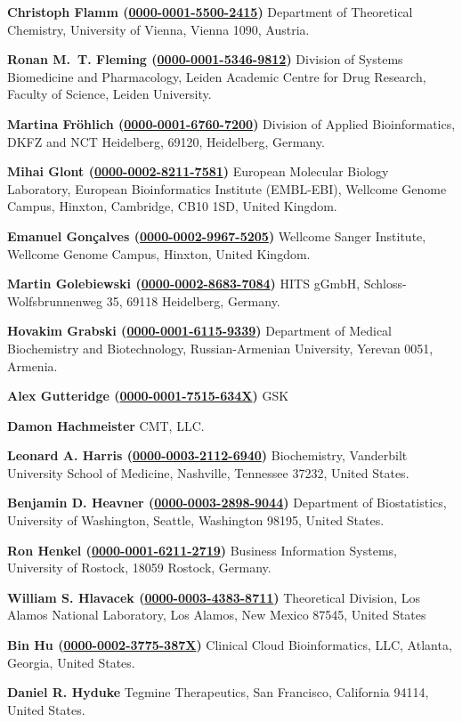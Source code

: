 \documentclass{sbml-paper}
\newcommand{\orcid}[1]{\href{https://orcid.org/#1}{#1}}
\begin{document}
\textbf{Christoph Flamm (\orcid{0000-0001-5500-2415})} Department of Theoretical Chemistry, University of Vienna, Vienna 1090, Austria.

\textbf{Ronan M.~T. Fleming (\orcid{0000-0001-5346-9812})} Division of Systems Biomedicine and Pharmacology, Leiden Academic Centre for Drug Research, Faculty of Science, Leiden University.

\textbf{Martina Fröhlich (\orcid{0000-0001-6760-7200})} Division of Applied Bioinformatics, DKFZ and NCT Heidelberg, 69120, Heidelberg, Germany.

\textbf{Mihai Glont (\orcid{0000-0002-8211-7581})} European Molecular Biology Laboratory, European Bioinformatics Institute (EMBL-EBI), Wellcome Genome Campus, Hinxton, Cambridge, CB10 1SD, United Kingdom.

\textbf{Emanuel Gonçalves (\orcid{0000-0002-9967-5205})} Wellcome Sanger Institute, Wellcome Genome Campus, Hinxton, United Kingdom.

\textbf{Martin Golebiewski (\orcid{0000-0002-8683-7084})} HITS gGmbH, Schloss-Wolfsbrunnenweg 35, 69118 Heidelberg, Germany.

\textbf{Hovakim Grabski (\orcid{0000-0001-6115-9339})} Department of Medical Biochemistry and Biotechnology, Russian-Armenian University, Yerevan 0051, Armenia.

\textbf{Alex Gutteridge (\orcid{0000-0001-7515-634X})} GSK

\textbf{Damon Hachmeister} CMT, LLC.

\textbf{Leonard A. Harris (\orcid{0000-0003-2112-6940})} Biochemistry, Vanderbilt University School of Medicine, Nashville, Tennessee 37232, United States.

\textbf{Benjamin D. Heavner (\orcid{0000-0003-2898-9044})} Department of Biostatistics, University of Washington, Seattle, Washington 98195, United States.

\textbf{Ron Henkel (\orcid{0000-0001-6211-2719})} Business Information Systems, University of Rostock, 18059 Rostock, Germany.

\textbf{William S. Hlavacek (\orcid{0000-0003-4383-8711})} Theoretical Division, Los Alamos National Laboratory, Los Alamos, New Mexico 87545, United States

\textbf{Bin Hu (\orcid{0000-0002-3775-387X})} Clinical Cloud Bioinformatics, LLC, Atlanta, Georgia, United States.

\textbf{Daniel R. Hyduke} Tegmine Therapeutics, San Francisco, California 94114, United States.
\end{document}
